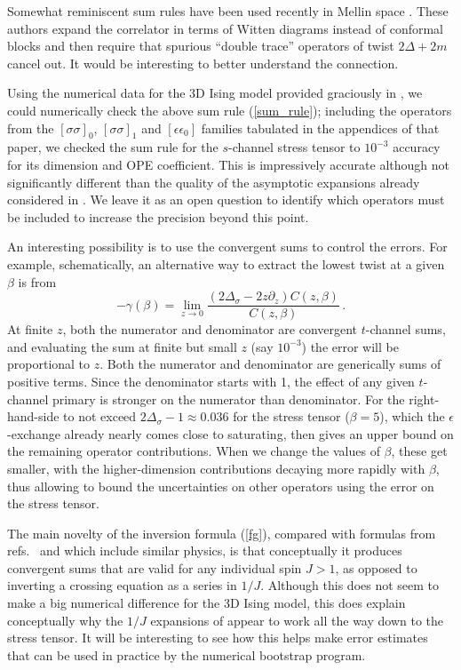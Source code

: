 \documentclass[11pt, reqno,preprint]{article}
\def\be{\begin{equation}}
\def\ee{\end{equation}}
\def\j{J}
\begin{document}
Somewhat reminiscent sum rules have been used recently in Mellin space \cite{Gopakumar:2016wkt,Gopakumar:2016cpb}.
These authors expand the correlator in terms of Witten diagrams instead of conformal blocks and then require
that spurious ``double trace'' operators of twist $2\Delta+2m$ cancel out. It would be interesting to better understand the connection.

Using the numerical data for the 3D Ising model provided graciously in \cite{Simmons-Duffin:2016wlq},
we could numerically check the above sum rule (\ref{sum_rule}); including the operators
from the $[\sigma\sigma]_0$, $[\sigma\sigma]_1$ and $[\epsilon\epsilon_0]$ families tabulated in the appendices of that paper,
we checked the sum rule for the $s$-channel stress tensor to $10^{-3}$ accuracy for its dimension and OPE coefficient.
This is impressively accurate although not significantly different than the quality of the asymptotic expansions already considered in \cite{Simmons-Duffin:2016wlq}. We leave it as an open question to identify which operators must be included
to increase the precision beyond this point.

An interesting possibility is to use the convergent sums to control the errors.
For example, schematically, an alternative way to extract the lowest twist at a given $\beta$ is from
\be
 -\gamma(\beta)= \lim_{z\to 0} \frac{(2\Delta_\sigma-2z\partial_z) C(z,\beta)}{C(z,\beta)}\,.
\ee
At finite $z$, both the numerator and denominator are convergent $t$-channel sums,
and evaluating the sum at finite but small $z$ (say $10^{-3}$) the error will be proportional to $z$.
Both the numerator and denominator are generically sums of positive terms.
Since the denominator starts with 1, the effect of any given $t$-channel primary
is stronger on the numerator than denominator. For the right-hand-side to not exceed
$2\Delta_\sigma-1\approx 0.036$ for the stress tensor ($\beta=5$),  which the $\epsilon$-exchange already nearly comes close
to saturating, then gives an upper bound on the remaining operator contributions.
When we change the values of $\beta$, these get smaller,
with the higher-dimension contributions decaying more rapidly with $\beta$, thus allowing to bound the uncertainties on other operators using the error on the stress tensor.

The main novelty of the inversion formula (\ref{fg}), compared with formulas from
refs.~\cite{Alday:2015ota} and \cite{Simmons-Duffin:2016wlq} which include similar physics,
is that conceptually it produces convergent sums that are valid for any individual spin $\j>1$,
as opposed to inverting a crossing equation as a series in $1/\j$. Although this does not seem to make a big numerical
difference for the 3D Ising model, this does explain conceptually why the $1/\j$ expansions
of \cite{Alday:2015ota,Simmons-Duffin:2016wlq} appear to work all the way down to the stress tensor.
It will be interesting to see how this helps make error estimates
that can be used in practice by the numerical bootstrap program.
\end{document}
